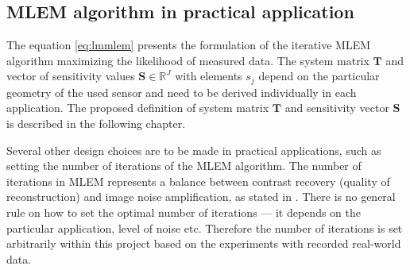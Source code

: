 \subsection{MLEM algorithm in practical application}
The equation \ref{eq:lmmlem} presents the formulation of the iterative \ac{MLEM} algorithm maximizing the likelihood of measured data.
The system matrix $\mathbf{T}$ and vector of sensitivity values $\mathbf{S} \in \mathbb{R}^{J}$ with elements $s_{j}$ depend on the particular geometry of the used sensor and need to be derived individually in each application.
The proposed definition of system matrix $\mathbf{T}$ and sensitivity vector $\mathbf{S}$ is described in the following chapter. 

Several other design choices are to be made in practical applications, such as setting the number of iterations of the \ac{MLEM} algorithm.
The number of iterations in \ac{MLEM} represents a balance between contrast recovery (quality of reconstruction) and image noise amplification, as stated in \cite{handheld_mlem_reconstruction}.
There is no general rule on how to set the optimal number of iterations --- it depends on the particular application, level of noise etc.
Therefore the number of iterations is set arbitrarily within this project based on the experiments with recorded real-world data.


















